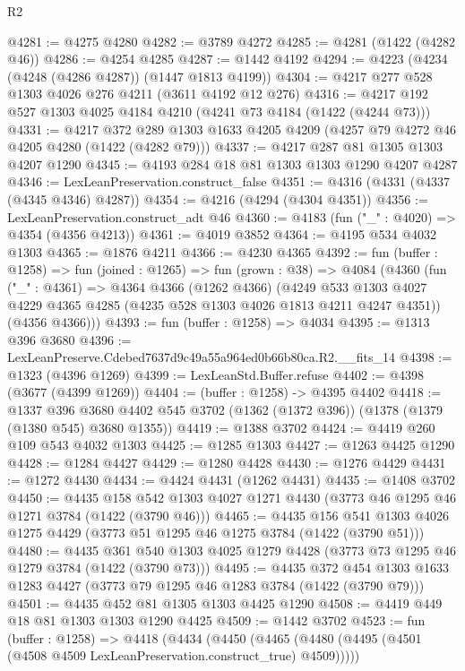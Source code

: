 \begin{lexlean}{R2}
\begin{coremodule}
@4281 := @4275 @4280
@4282 := @3789 @4272
@4285 := @4281 (@1422 (@4282 @46))
@4286 := @4254 @4285
@4287 := @1442 @4192
@4294 := @4223 (@4234 (@4248 (@4286 @4287)) (@1447 @1813 @4199))
@4304 := @4217 @277 @528 @1303 @4026 @276 @4211 (@3611 @4192 @12 @276)
@4316 := @4217 @192 @527 @1303 @4025 @4184 @4210 (@4241 @73 @4184 (@1422 (@4244 @73)))
@4331 := @4217
    @372
    @289
    @1303
    @1633
    @4205
    @4209
    (@4257 @79 @4272 @46 @4205 @4280 (@1422 (@4282 @79)))
@4337 := @4217 @287 @81 @1305 @1303 @4207 @1290
@4345 := @4193 @284 @18 @81 @1303 @1303 @1290 @4207 @4287
@4346 := LexLeanPreservation.construct_false
@4351 := @4316 (@4331 (@4337 (@4345 @4346) @4287))
@4354 := @4216 (@4294 (@4304 @4351))
@4356 := LexLeanPreservation.construct_adt @46
@4360 := @4183 (fun ("_" : @4020) => @4354 (@4356 @4213))
@4361 := @4019 @3852
@4364 := @4195 @534 @4032 @1303
@4365 := @1876 @4211
@4366 := @4230 @4365
@4392 := fun (buffer : @1258) =>
  fun (joined : @1265) =>
  fun (grown : @38) =>
  @4084
    (@4360
      (fun ("_" : @4361) =>
      @4364
        @4366
        (@1262 @4366)
        (@4249 @533 @1303 @4027 @4229 @4365 @4285 (@4235 @528 @1303 @4026 @1813 @4211 @4247 @4351))
        (@4356 @4366)))
@4393 := fun (buffer : @1258) => @4034
@4395 := @1313 @396 @3680
@4396 := LexLeanPreserve.Cdebed7637d9c49a55a964ed0b66b80ca.R2.__fits_14
@4398 := @1323 (@4396 @1269)
@4399 := LexLeanStd.Buffer.refuse
@4402 := @4398 (@3677 (@4399 @1269))
@4404 := (buffer : @1258) -> @4395 @4402
@4418 := @1337
    @396
    @3680
    @4402
    @545
    @3702
    (@1362 (@1372 @396))
    (@1378 (@1379 (@1380 @545) @3680 @1355))
@4419 := @1388 @3702
@4424 := @4419 @260 @109 @543 @4032 @1303
@4425 := @1285 @1303
@4427 := @1263 @4425 @1290
@4428 := @1284 @4427
@4429 := @1280 @4428
@4430 := @1276 @4429
@4431 := @1272 @4430
@4434 := @4424 @4431 (@1262 @4431)
@4435 := @1408 @3702
@4450 := @4435
    @158
    @542
    @1303
    @4027
    @1271
    @4430
    (@3773 @46 @1295 @46 @1271 @3784 (@1422 (@3790 @46)))
@4465 := @4435
    @156
    @541
    @1303
    @4026
    @1275
    @4429
    (@3773 @51 @1295 @46 @1275 @3784 (@1422 (@3790 @51)))
@4480 := @4435
    @361
    @540
    @1303
    @4025
    @1279
    @4428
    (@3773 @73 @1295 @46 @1279 @3784 (@1422 (@3790 @73)))
@4495 := @4435
    @372
    @454
    @1303
    @1633
    @1283
    @4427
    (@3773 @79 @1295 @46 @1283 @3784 (@1422 (@3790 @79)))
@4501 := @4435 @452 @81 @1305 @1303 @4425 @1290
@4508 := @4419 @449 @18 @81 @1303 @1303 @1290 @4425
@4509 := @1442 @3702
@4523 := fun (buffer : @1258) =>
  @4418
    (@4434
      (@4450 (@4465 (@4480 (@4495 (@4501 (@4508 @4509 LexLeanPreservation.construct_true) @4509)))))

\end{coremodule}
\end{lexlean}

